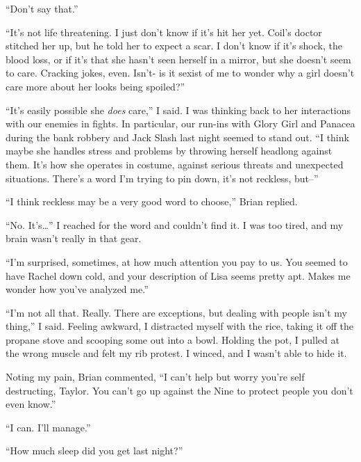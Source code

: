 ``Don't say that.''



``It's not life threatening.  I just don't know if it's hit her yet.  Coil's doctor stitched her up, but he told her to expect a scar.  I don't know if it's shock, the blood loss, or if it's that she hasn't seen herself in a mirror, but she doesn't seem to care.  Cracking jokes, even.  Isn't- is it sexist of me to wonder why a girl doesn't care more about her looks being spoiled?''



``It's easily possible she \emph{does} care,'' I said.  I was thinking back to her interactions with our enemies in fights.  In particular, our run-ins with Glory Girl and Panacea during the bank robbery and Jack Slash last night seemed to stand out.  ``I think maybe she handles stress and problems by throwing herself headlong against them.  It's how she operates in costume, against serious threats and unexpected situations.  There's a word I'm trying to pin down, it's not reckless, but--''



``I think reckless may be a very good word to choose,'' Brian replied.



``No.  It's\ldots'' I reached for the word and couldn't find it.  I was too tired, and my brain wasn't really in that gear.



``I'm surprised, sometimes, at how much attention you pay to us.  You seemed to have Rachel down cold, and your description of Lisa seems pretty apt.  Makes me wonder how you've analyzed me.''



``I'm not all that.  Really.  There are exceptions, but dealing with people isn't my thing,'' I said.  Feeling awkward, I distracted myself with the rice, taking it off the propane stove and scooping some out into a bowl.  Holding the pot, I pulled at the wrong muscle and felt my rib protest.  I winced, and I wasn't able to hide it.



Noting my pain, Brian commented, ``I can't help but worry you're self destructing, Taylor.  You can't go up against the Nine to protect people you don't even know.''



``I can.  I'll manage.''



``How much sleep did you get last night?''



